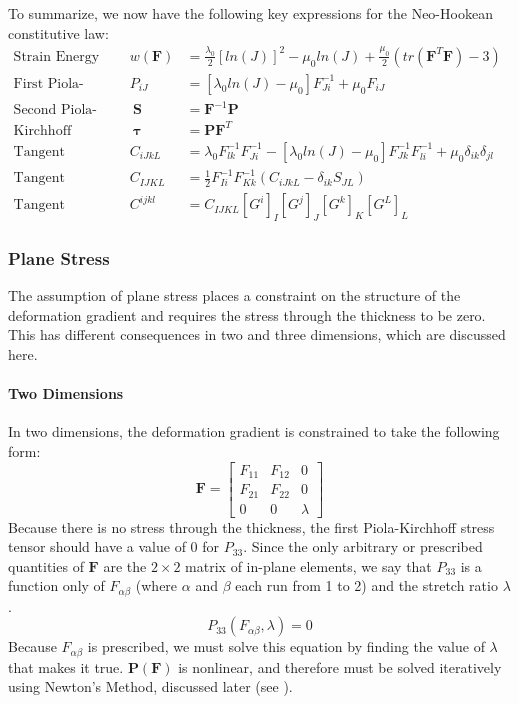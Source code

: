 \documentclass[]{spie}  %
\begin{document}
To summarize, we now have the following key expressions for the Neo-Hookean constitutive law:
\begin{align}
\textrm{Strain Energy Density:}			& \ & w(\bm{F}) &= \frac{\lambda_0}{2}[ln(J)]^2 - \mu_0 ln(J) +
\frac{\mu_0}{2}(tr(\bm{F}^T\bm{F}) - 3) & \\
\textrm{First Piola-Kirchhoff Stress:} 	& \ & P_{iJ} 	&= \left[\lambda_0 ln(J) - \mu_0 \right]F^{-1}_{Ji} + \mu_0 F_{iJ}
& \\
\textrm{Second Piola-Kirchhoff Stress:} & \ & \ \bm{S} &= \bm{F}^{-1} \bm{P} & \\
\textrm{Kirchhoff Stress:} 				& \ & \ \bm{\tau} &= \bm{P} \bm{F}^T \\
\textrm{Tangent Moduli:}				& \ & C_{iJkL}	&= \lambda_0  F^{-1}_{lk} F^{-1}_{Ji} - \left[\lambda_0 ln(J) -
\mu_0 \right] F^{-1}_{Jk} F^{-1}_{li} + \mu_0 \delta_{ik}\delta_{jl} & \\
\textrm{Tangent Moduli Lab:}			& \ & C_{IJKL} &= \frac{1}{2} F^{-1}_{Ii}F^{-1}_{Kk} \left(C_{iJkL} - \delta_{ik} S_{JL}\right) & \\ 
\textrm{Tangent Moduli Contravariant:}	& \ & C^{ijkl} &= C_{IJKL} \left[G^i\right]_I \left[G^j\right]_J \left[G^k\right]_K \left[G^L\right]_L & 
\end{align}

\subsubsection{Plane Stress}
The assumption of plane stress places a constraint on the structure of the deformation gradient and requires the stress through the thickness to be zero. This has different consequences in two and three dimensions, which are discussed here.

\paragraph{Two Dimensions}
In two dimensions, the deformation gradient is constrained to take the following form:
\begin{equation}
\bm{F} = 
\begin{bmatrix}
F_{11} 	& F_{12} 	& 0 \\
F_{21} 	& F_{22} 	& 0 \\
0   	& 0			& \lambda	
\end{bmatrix}
\end{equation}
Because there is no stress through the thickness, the first Piola-Kirchhoff stress tensor should have a value of 0 for $P_{33}$. Since the only arbitrary or prescribed quantities of $\bm{F}$ are the $2 \times 2$ matrix of in-plane elements, we say that $P_{33}$ is a function only of $F_{\alpha\beta}$ (where $\alpha$ and $\beta$ each run from 1 to 2) and the stretch ratio $\lambda$.
\begin{equation}
P_{33}(F_{\alpha\beta}, \lambda) = 0
\end{equation}  
Because $F_{\alpha\beta}$ is prescribed, we must solve this equation by finding the value of $\lambda$ that makes it true. $\bm{P}(\bm{F})$ is nonlinear, and therefore must be solved iteratively using Newton's Method, discussed later (see \textit{}). 
\end{document}
